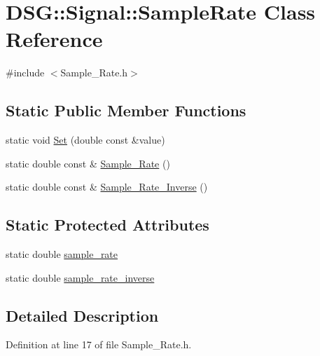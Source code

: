 \hypertarget{classDSG_1_1Signal_1_1SampleRate}{\section{D\+S\+G\+:\+:Signal\+:\+:Sample\+Rate Class Reference}
\label{classDSG_1_1Signal_1_1SampleRate}
}


{\ttfamily \#include $<$Sample\+\_\+\+Rate.\+h$>$}

\subsection*{Static Public Member Functions}
\begin{DoxyCompactItemize}
\item 
static void \hyperlink{classDSG_1_1Signal_1_1SampleRate_a84e8fc02b37ced6fd3c8f3b2c9aad745}{Set} (double const \&value)
\item 
static double const \& \hyperlink{classDSG_1_1Signal_1_1SampleRate_abfeba1b030eb117126ecc7cb7810a467}{Sample\+\_\+\+Rate} ()
\item 
static double const \& \hyperlink{classDSG_1_1Signal_1_1SampleRate_a929dce1c278b5828455b35df31f88fc0}{Sample\+\_\+\+Rate\+\_\+\+Inverse} ()
\end{DoxyCompactItemize}
\subsection*{Static Protected Attributes}
\begin{DoxyCompactItemize}
\item 
static double \hyperlink{classDSG_1_1Signal_1_1SampleRate_a367ed311b4d15f30e99ccfd6da76ee6d}{sample\+\_\+rate}
\item 
static double \hyperlink{classDSG_1_1Signal_1_1SampleRate_aff4ae45050bb2179bf57a1f047f8ede6}{sample\+\_\+rate\+\_\+inverse}
\end{DoxyCompactItemize}


\subsection{Detailed Description}


Definition at line 17 of file Sample\+\_\+\+Rate.\+h.



